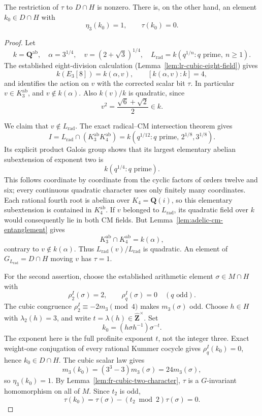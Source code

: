 \begin{lemma}\label{lem:fr-cubic-two-arithmetic-bit}
The restriction of \(\tau\) to \(D\cap H\) is nonzero. There is,
on the other hand, an element \(k_0\in D\cap H\) with
\[
                  \eta_3(k_0)=1,\qquad \tau(k_0)=0.
\]
\end{lemma}

\begin{proof}
Let
\[
 k=\mathbf Q^{\mathrm{ab}},\quad
 \alpha=3^{1/4},\quad
 v=(2+\sqrt3)^{1/4},\quad
 L_{\mathrm{rad}}=k(q^{1/n}:q\text{ prime},\ n\ge1).
\]
The established eight-division calculation
(Lemma~\ref{lem:lr-cubic-eight-field}) gives
\[
 k(E_3[8])=k(\alpha,v),\qquad [k(\alpha,v):k]=4,
\]
and identifies the action on \(v\) with the corrected scalar bit
\(\tau\). In particular \(v\in K_3^{\mathrm{ab}}\), and
\(v\notin k(\alpha)\). Also \(k(v)/k\) is quadratic, since
\[
 v^2=\frac{\sqrt6+\sqrt2}{2}\in k.
\]

We claim that \(v\notin L_{\mathrm{rad}}\).
The exact radical--CM intersection theorem gives
\[
 I=L_{\mathrm{rad}}\cap
       (K_3^{\mathrm{ab}}K_4^{\mathrm{ab}})
   =k(q^{1/12}:q\text{ prime},\,2^{1/8},3^{1/8}).
\]
Its explicit product Galois group shows that its largest elementary
abelian subextension of exponent two is
\[
                         k(q^{1/4}:q\text{ prime}).
\]
This follows coordinate by coordinate from the cyclic factors of
orders twelve and six; every continuous quadratic character uses
only finitely many coordinates. Each rational fourth root is abelian
over \(K_4=\mathbf Q(i)\), so this elementary subextension is contained
in \(K_4^{\mathrm{ab}}\).
If \(v\) belonged to \(L_{\mathrm{rad}}\), its quadratic field over
\(k\) would consequently lie in both CM fields. But
Lemma~\ref{lem:adelic-cm-entanglement} gives
\[
 K_3^{\mathrm{ab}}\cap K_4^{\mathrm{ab}}=k(\alpha),
\]
contrary to \(v\notin k(\alpha)\).
Thus \(L_{\mathrm{rad}}(v)/L_{\mathrm{rad}}\) is quadratic.
An element of \(G_{L_{\mathrm{rad}}}=D\cap H\) moving \(v\)
has \(\tau=1\).

For the second assertion, choose the established arithmetic element
\(\sigma\in M\cap H\) with
\[
 \rho_2^I(\sigma)=2,\qquad
 \rho_q^I(\sigma)=0\quad(q\text{ odd}).
\]
The cubic congruence
\(\rho_2^I\equiv-2m_3\pmod4\) makes \(m_3(\sigma)\) odd.
Choose \(h\in H\) with \(\lambda_2(h)=3\), and write
\(t=\lambda(h)\in\widehat{\mathbf Z}^{\times}\). Set
\[
                 k_0=(h\sigma h^{-1})\sigma^{-t}.
\]
The exponent here is the full profinite exponent \(t\), not the
integer three. Exact weight-one conjugation of every rational
Kummer cocycle gives \(\rho_q^I(k_0)=0\), hence \(k_0\in D\cap H\).
The cubic scalar law gives
\[
 m_3(k_0)=(3^3-3)m_3(\sigma)=24m_3(\sigma),
\]
so \(\eta_3(k_0)=1\).
By Lemma~\ref{lem:fr-cubic-two-character}, \(\tau\) is a
\(G\)-invariant homomorphism on all of \(M\). Since \(t_2\) is odd,
\[
 \tau(k_0)=\tau(\sigma)-(t_2\bmod2)\tau(\sigma)=0.
\]
\end{proof}

